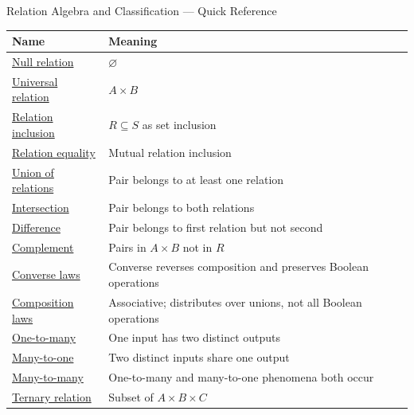 \begin{toolkitbox}{Relation Algebra and Classification --- Quick Reference}
\small
\begin{tabular}{l l}
\toprule
\textbf{Name}  & \textbf{Meaning} \\
\midrule
\hyperref[def:null-relation]{Null relation}        & $\varnothing$                                               \\
\hyperref[def:universal-relation]{Universal relation}   & $A\times B$                                                 \\
\hyperref[def:relation-inclusion]{Relation inclusion}   & $R\subseteq S$ as set inclusion                             \\
\hyperref[def:relation-equality]{Relation equality}    & Mutual relation inclusion                                   \\
\hyperref[def:relation-union]{Union of relations}   & Pair belongs to at least one relation                       \\
\hyperref[def:relation-intersection]{Intersection}         & Pair belongs to both relations                              \\
\hyperref[def:relation-difference]{Difference}           & Pair belongs to first relation but not second               \\
\hyperref[def:relation-complement]{Complement}           & Pairs in $A\times B$ not in $R$                             \\
\hyperref[thm:relation-converse-laws]{Converse laws}        & Converse reverses composition and preserves Boolean operations \\
\hyperref[thm:relation-composition-boolean]{Composition laws}     & Associative; distributes over unions, not all Boolean operations \\
\hyperref[def:one-to-many-relation]{One-to-many}          & One input has two distinct outputs                          \\
\hyperref[def:many-to-one-relation]{Many-to-one}          & Two distinct inputs share one output                        \\
\hyperref[def:many-to-many-relation]{Many-to-many}         & One-to-many and many-to-one phenomena both occur            \\
\hyperref[def:many-place-relation]{Ternary relation}     & Subset of $A\times B\times C$                               \\
\bottomrule
\end{tabular}
\end{toolkitbox}


